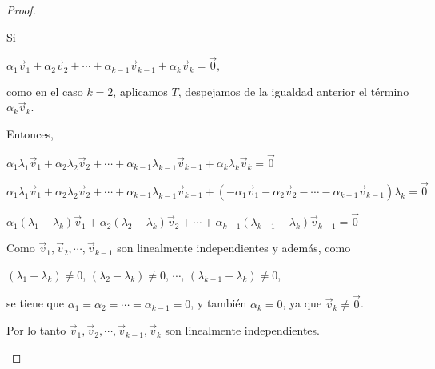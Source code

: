 \begin{theorem}
\begin{proof}
\begin{itemize}
Si 

$\alpha_1 \Vec{v}_1 + \alpha_2 \Vec{v}_2  + \cdots + \alpha_{k-1} \Vec{v}_{k-1} + \alpha_{k} \Vec{v}_{k} = \Vec{0},$

\bigskip

como en el caso $k=2$, aplicamos $T$, despejamos de la igualdad anterior el término $\alpha_{k} \Vec{v}_{k}$. 

Entonces,

\bigskip 

$ \alpha_1 \lambda_1\Vec{v}_1 + \alpha_2 \lambda_2\Vec{v}_2 + \cdots  +\alpha_{k-1} \lambda_{k-1}\Vec{v}_{k-1}+  \alpha_{k} \lambda_{k}\Vec{v}_{k}=  \Vec{0} $

\bigskip

$ \alpha_1 \lambda_1\Vec{v}_1 + \alpha_2 \lambda_2\Vec{v}_2 + \cdots  +\alpha_{k-1} \lambda_{k-1}\Vec{v}_{k-1}+( -\alpha_1 \Vec{v}_1 - \alpha_2 \Vec{v}_2  - \cdots - \alpha_{k-1} \Vec{v}_{k-1}) \lambda_k =  \Vec{0} $

\bigskip



$ \alpha_1( \lambda_1 - \lambda_k) \Vec{v}_1 + \alpha_2 (\lambda_2 - \lambda_k) \Vec{v}_2 + \cdots  +\alpha_{k-1} (\lambda_{k-1} - \lambda_k) \Vec{v}_{k-1}=  \Vec{0} $

\bigskip

Como $\Vec{v}_1, \Vec{v}_2, \cdots,   \Vec{v}_{k-1}$ son linealmente independientes y además, como

\bigskip

$(\lambda_1 - \lambda_k ) \neq  0$, $(\lambda_2 - \lambda_k ) \neq  0$, $ \cdots $, $(\lambda_{k-1} - \lambda_k) \neq  0$,

\bigskip
\noindent
se tiene que  $  \alpha_1=  \alpha_2 = \cdots = \alpha_{k-1}=0$, y también $\alpha_{k}=0$, ya que $\Vec{v}_{k} \neq \Vec{0}$.

\bigskip

Por lo tanto $\Vec{v}_1, \Vec{v}_2, \cdots,   \Vec{v}_{k-1}, \Vec{v}_{k} $ son linealmente independientes.
\end{itemize}
\end{proof}


\end{theorem}


\bigskip

\bigskip

\bigskip

